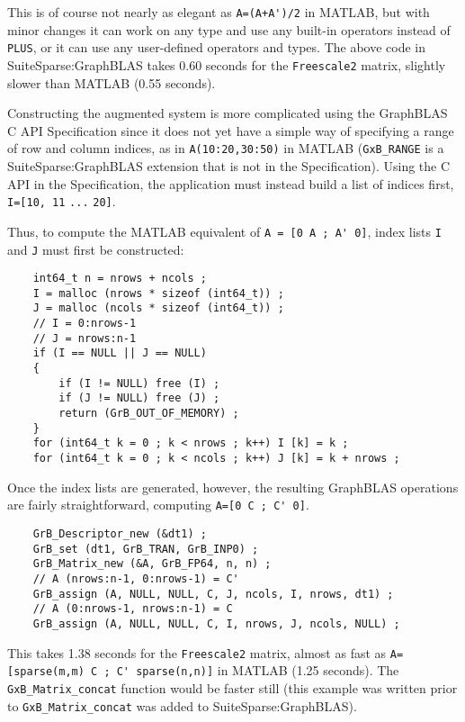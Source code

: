 \documentclass[12pt]{article}
\begin{document}
This is of course not nearly as elegant as \verb"A=(A+A')/2" in MATLAB, but
with minor changes it can work on any type and use any built-in operators
instead of \verb'PLUS', or it can use any user-defined operators and types.
The above code in SuiteSparse:GraphBLAS takes 0.60 seconds for the
\verb'Freescale2' matrix, slightly slower than MATLAB (0.55 seconds).

Constructing the augmented system is more complicated using the GraphBLAS C API
Specification since it does not yet have a simple way of specifying a range of
row and column indices, as in \verb'A(10:20,30:50)' in MATLAB (\verb'GxB_RANGE'
is a SuiteSparse:GraphBLAS extension that is not in the Specification).  Using
the C API in the Specification, the application must instead build a list of
indices first, \verb'I=[10, 11' \verb'...' \verb'20]'.

Thus, to compute the MATLAB equivalent of \verb"A = [0 A ; A' 0]", index lists
\verb'I' and \verb'J' must first be constructed:

    \vspace{-0.05in}
    {\footnotesize
    \begin{verbatim}
    int64_t n = nrows + ncols ;
    I = malloc (nrows * sizeof (int64_t)) ;
    J = malloc (ncols * sizeof (int64_t)) ;
    // I = 0:nrows-1
    // J = nrows:n-1
    if (I == NULL || J == NULL)
    {
        if (I != NULL) free (I) ;
        if (J != NULL) free (J) ;
        return (GrB_OUT_OF_MEMORY) ;
    }
    for (int64_t k = 0 ; k < nrows ; k++) I [k] = k ;
    for (int64_t k = 0 ; k < ncols ; k++) J [k] = k + nrows ; \end{verbatim}}

Once the index lists are generated, however, the resulting GraphBLAS operations
are fairly straightforward, computing \verb"A=[0 C ; C' 0]".

    \vspace{-0.05in}
    {\footnotesize
    \begin{verbatim}
    GrB_Descriptor_new (&dt1) ;
    GrB_set (dt1, GrB_TRAN, GrB_INP0) ;
    GrB_Matrix_new (&A, GrB_FP64, n, n) ;
    // A (nrows:n-1, 0:nrows-1) = C'
    GrB_assign (A, NULL, NULL, C, J, ncols, I, nrows, dt1) ;
    // A (0:nrows-1, nrows:n-1) = C
    GrB_assign (A, NULL, NULL, C, I, nrows, J, ncols, NULL) ; \end{verbatim}}

This takes 1.38 seconds for the \verb'Freescale2' matrix, almost as fast as \newline
\verb"A=[sparse(m,m) C ; C' sparse(n,n)]" in MATLAB (1.25 seconds).
The \verb'GxB_Matrix_concat' function would be faster still (this example
was written prior to \verb'GxB_Matrix_concat' was added to SuiteSparse:GraphBLAS).
\end{document}
